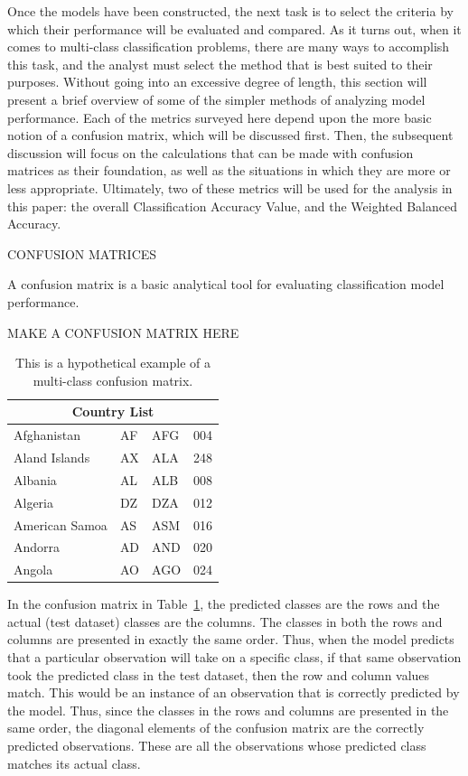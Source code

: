 \documentclass[12pt]{article}
\begin{document}
Once the models have been constructed, the next task is to select the criteria 
by which their performance will be evaluated and compared.  As it turns out, 
when it comes to multi-class classification problems, there are many ways to 
accomplish this task, and the analyst must select the method that is best 
suited to their purposes.  Without going into an excessive degree of length, 
this section will present a brief overview of some of the simpler methods of 
analyzing model performance.  Each of the metrics surveyed here depend upon 
the more basic notion of a confusion matrix, which will be discussed first.  
Then, the subsequent discussion will focus on the calculations that can be 
made with confusion matrices as their foundation, as well as the situations 
in which they are more or less appropriate.  Ultimately, two of these metrics 
will be used for the analysis in this paper: the overall Classification 
Accuracy Value, and the Weighted Balanced Accuracy.   

CONFUSION MATRICES

A confusion matrix is a basic analytical tool for evaluating classification model performance.  

MAKE A CONFUSION MATRIX HERE
\begin{table}[tbp]
\caption{This is a hypothetical example of a multi-class confusion matrix.}
\label{tab:conf}
\centering
\begin{tabular}{ |p{3cm}||p{3cm}|p{3cm}|p{3cm}|  }
 \hline
 \multicolumn{4}{|c|}{Country List} \\
 \hline
 Afghanistan   & AF    &AFG&   004\\
 Aland Islands&   AX  & ALA   &248\\
 Albania &AL & ALB&  008\\
 Algeria    &DZ & DZA&  012\\
 American Samoa&   AS  & ASM&016\\
 Andorra& AD  & AND   &020\\
 Angola& AO  & AGO&024\\
 \hline
\end{tabular}
\end{table}

In the confusion matrix in Table~\ref{tab:conf}, the predicted classes are the 
rows and the actual (test dataset) classes are the columns.  The classes in 
both the rows and columns are presented in exactly the same order.  Thus, when 
the model predicts that a particular observation will take on a specific class, 
if that same observation took the predicted class in the test dataset, then the 
row and column values match.  This would be an instance of an observation that 
is correctly predicted by the model.  Thus, since the classes in the rows and 
columns are presented in the same order, the diagonal elements of the confusion 
matrix are the correctly predicted observations.  These are all the observations 
whose predicted class matches its actual class.  
\end{document}
